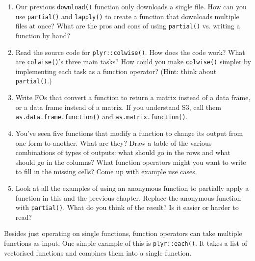 \begin{enumerate}
\def\labelenumi{\arabic{enumi}.}
\item
  Our previous \texttt{download()} function only downloads a single
  file. How can you use \texttt{partial()} and \texttt{lapply()} to
  create a function that downloads multiple files at once? What are the
  pros and cons of using \texttt{partial()} vs. writing a function by
  hand?
\item
  Read the source code for \texttt{plyr::colwise()}. How does the code
  work? What are \texttt{colwise()}'s three main tasks? How could you
  make \texttt{colwise()} simpler by implementing each task as a
  function operator? (Hint: think about \texttt{partial()}.)
\item
  Write FOs that convert a function to return a matrix instead of a data
  frame, or a data frame instead of a matrix. If you understand S3, call
  them \texttt{as.data.frame.function()} and
  \texttt{as.matrix.function()}.
\item
  You've seen five functions that modify a function to change its output
  from one form to another. What are they? Draw a table of the various
  combinations of types of outputs: what should go in the rows and what
  should go in the columns? What function operators might you want to
  write to fill in the missing cells? Come up with example use cases.
\item
  Look at all the examples of using an anonymous function to partially
  apply a function in this and the previous chapter. Replace the
  anonymous function with \texttt{partial()}. What do you think of the
  result? Is it easier or harder to read?
\end{enumerate}


Besides just operating on single functions, function operators can take
multiple functions as input. One simple example of this is
\texttt{plyr::each()}. It takes a list of vectorised functions and
combines them into a single function. 

\begin{Shaded}
\begin{Highlighting}[]
\StringTok{ }
\NormalTok{(}\NormalTok{:}\NormalTok{)}
\end{Highlighting}
\end{Shaded}

